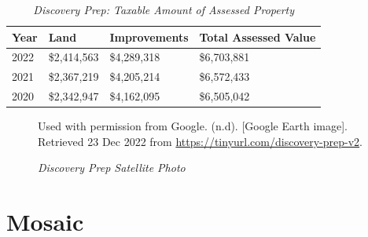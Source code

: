 \begin{table}[hbtp]
  \SingleSpacing%
  \caption[Discovery Prep: Taxable Amount of Assessed Propery]{\textit{Discovery Prep: Taxable Amount of Assessed Property}}\label{tab:discovery-prep-taxable-amount}
  \begin{tabular}{llll}
    \toprule
    Year & Land        & Improvements & Total Assessed Value \\
    \midrule
    2022 & \$2,414,563 & \$4,289,318  & \$6,703,881 \\
    2021 & \$2,367,219 & \$4,205,214  & \$6,572,433 \\
    2020 & \$2,342,947 & \$4,162,095  & \$6,505,042 \\
    \bottomrule
  \end{tabular}
\end{table}

\begin{figure}[hbtp]
  \caption[Discovery Prep Satellite Photo]{\textit{Discovery Prep Satellite Photo}}%
  \label{fig:discovery-prep-sat-photo}
  {Used with permission from Google. (n.d). [Google Earth image]. Retrieved 23 Dec 2022 from \url{https://tinyurl.com/discovery-prep-v2}.}
\end{figure}


\clearpage
\section{Mosaic}\label{sec:mosaic-info}\indent

